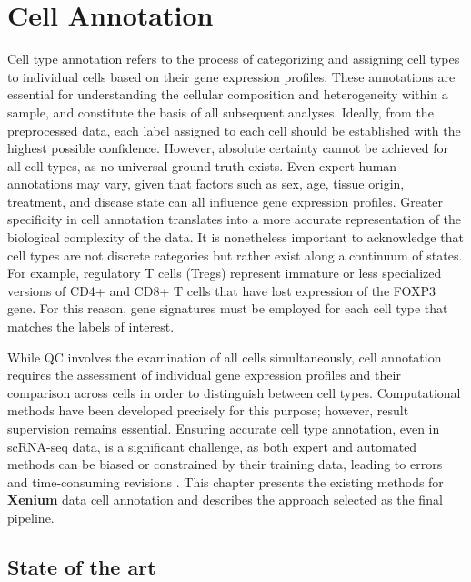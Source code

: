 \setchapterpreamble[u]{\margintoc}
\chapter{Cell Annotation}

Cell type annotation refers to the process of categorizing and assigning cell types to individual cells based on their gene expression profiles. These annotations are essential for understanding the cellular composition and heterogeneity within a sample, and constitute the basis of all subsequent analyses. Ideally, from the preprocessed data, each label assigned to each cell should be established with the highest possible confidence. However, absolute certainty cannot be achieved for all cell types, as no universal ground truth exists. Even expert human annotations may vary, given that factors such as sex, age, tissue origin, treatment, and disease state can all influence gene expression profiles. Greater specificity in cell annotation translates into a more accurate representation of the biological complexity of the data. It is nonetheless important to acknowledge that cell types are not discrete categories but rather exist along a continuum of states. For example, regulatory T cells (Tregs) represent immature or less specialized versions of CD4+ and CD8+ T cells that have lost expression of the FOXP3 gene. For this reason, gene signatures must be employed for each cell type that matches the labels of interest.

While QC involves the examination of all cells simultaneously, cell annotation requires the assessment of individual gene expression profiles and their comparison across cells in order to distinguish between cell types. Computational methods have been developed precisely for this purpose; however, result supervision remains essential. Ensuring accurate cell type annotation, even in scRNA-seq data, is a significant challenge, as both expert and automated methods can be biased or constrained by their training data, leading to errors and time-consuming revisions \cite{Wenjin.Ye}. This chapter presents the existing methods for \textbf{Xenium} data cell annotation and describes the approach selected as the final pipeline.

\section{State of the art}

